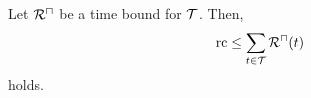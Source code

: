 \begin{theorem}
  Let ${\mathcal{R}^\sqcap}$ be a time bound for $\mathcal{T}$.
  Then, 
  \[ \text{rc} \leq \sum_{t \in \mathcal{T}}{\mathcal{R}^\sqcap}(t) \]
  holds.
\end{theorem}
